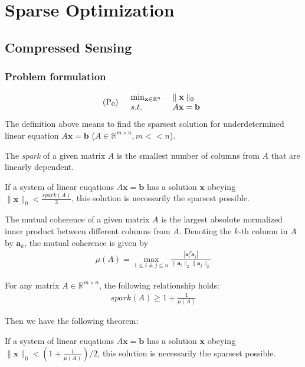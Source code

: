 \chapter{Sparse Optimization}
\vspace{1em}
\section{Compressed Sensing}
\subsection{Problem formulation}
\begin{align}
    (\textnormal{P}_0) \quad
    \begin{array}{ll}
        \min_{\mathbf{x} \in \mathbb{R}^n}
        \ &\parallel \mathbf{x} \parallel_0 \\
        s.t. \ &A\mathbf{x} = \mathbf{b}
    \end{array}
\end{align}
The definition above means to find
the sparsest solution for underdetermined
linear equation
$A\mathbf{x} = \mathbf{b}$
($A\in \mathbb{R}^{m\times n}, m << n$).
\begin{definition}[spark]
    The \emph{spark} of a given matrix $A$
    is the smallest number of columns
    from $A$ that are linearly
    dependent.
\end{definition}
\begin{theorem}
    If a system of linear euqations
    $A\mathbf{x} = \mathbf{b}$ has
    a solution $\mathbf{x}$ obeying
    $\parallel \mathbf{x} \parallel_0
    < \frac{spark(A)}{2}$,
    this solution is necessarily
    the sparsest possible.
\end{theorem}
\begin{definition}
    The mutual coherence of a given matrix $A$
    is the largest absolute normalized inner
    product between different columns from $A$.
    Denoting the $k$-th column in $A$ by $\mathbf{a}_k$,
    the mutual coherence is given by
    \begin{align}
        \mu(A) = \max_{1\leq i \neq j \leq n}
        \frac{|\mathbf{a}_i^T\mathbf{a}_j|}
        {\parallel\mathbf{a}_i\parallel_2
        \parallel\mathbf{a}_j\parallel_2}
    \end{align}
\end{definition}
\begin{lemma}
    For any matrix $A \in \mathbb{R}^{m\times n}$,
    the following relationship holds:
    \begin{align}
        spark(A) \geq 1 + \frac{1}{\mu(A)}
    \end{align}
\end{lemma}
Then we have the following theorem:
\begin{theorem}
    If a system of linear euqations
    $A\mathbf{x} = \mathbf{b}$ has
    a solution $\mathbf{x}$ obeying
    $\parallel \mathbf{x} \parallel_0
    < (1 + \frac{1}{\mu(A)})/2$,
    this solution is necessarily
    the sparsest possible.
\end{theorem}

